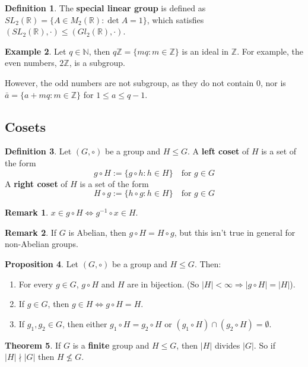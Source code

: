 \documentclass[12pt,a4paper]{article}
\theoremstyle{definition}
\newtheorem{definition}{Definition}[subsection]
\newtheorem{theorem}[definition]{Theorem}
\newtheorem{proposition}[definition]{Proposition}
\newtheorem{example}[definition]{Example}
\newtheorem*{remark}{Remark}
\begin{document}
\begin{definition}
	The \textbf{special linear group} is defined as $SL_2(\mathbb{R}) = \{ A \in M_2(\mathbb{R}): \det A = 1 \}$, which satisfies $(SL_2(\mathbb{R}), \cdot) \le (Gl_2(\mathbb{R}), \cdot)$.
\end{definition}

\begin{example}
	Let $q \in \mathbb{N}$, then $q \mathbb{Z} = \{ m q: m \in \mathbb{Z} \}$ is an ideal in $\mathbb{Z}$. For example, the even numbers, $2 \mathbb{Z}$, is a subgroup.

	However, the odd numbers are not subgroup, as they do not contain $0$, nor is $\bar{a} = \{ a + mq: m \in \mathbb{Z} \}$ for $1 \le a \le q - 1$.
\end{example}

\subsection{Cosets}

\begin{definition}
	Let $(G, \circ)$ be a group and $H \le G$. A \textbf{left coset} of $H$ is a set of the form
	\[
		g \circ H := \{ g \circ h: h \in H \} \quad \text{for } g \in G
	\]
	A \textbf{right coset} of $H$ is a set of the form
	\[
		H \circ g := \{ h \circ g: h \in H \} \quad \text{for } g \in G
	\]
\end{definition}

\begin{remark}
	$x \in g \circ H \Longleftrightarrow g^{-1} \circ x \in H$.
\end{remark}

\begin{remark}
	If $G$ is Abelian, then $g \circ H = H \circ g$, but this isn't true in general for non-Abelian groups.
\end{remark}

\begin{proposition}
	Let $(G, \circ)$ be a group and $H \le G$. Then:
	\begin{enumerate}
		\item For every $g \in G$, $g \circ H$ and $H$ are in bijection. (So $|H| < \infty \Rightarrow |g \circ H| = |H|$).
		\item If $g \in G$, then $g \in H \Longleftrightarrow g \circ H = H$.
		\item If $g_1, g_2 \in G$, then either $g_1 \circ H = g_2 \circ H$ or $(g_1 \circ H) \cap (g_2 \circ H) = \emptyset$.
	\end{enumerate}
\end{proposition}

\begin{theorem}
	If $G$ is a \textbf{finite} group and $H \le G$, then $|H|$ divides $|G|$. So if $|H| \nmid |G|$ then $H \not\le G$.
\end{theorem}
\end{document}
